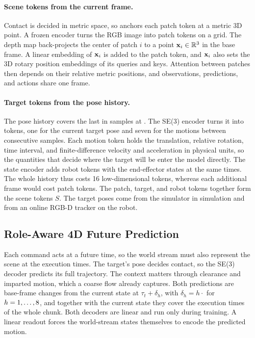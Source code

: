 \paragraph{Scene tokens from the current frame.}
Contact is decided in metric space, so \ours anchors each patch token at a metric 3D
point. A frozen \cfgVisualEncoder{} \cite{mae} encoder turns the RGB image into
\cfgPatches{} patch tokens on a \cfgContextGrid{} grid. The depth map back-projects the
center of patch $i$ to a point $\mathbf{x}_i\in\mathbb{R}^3$ in the base frame. A linear embedding
of $\mathbf{x}_i$ is added to the patch token, and $\mathbf{x}_i$ also sets the 3D rotary
position embeddings of its queries and keys. Attention between patches then depends on
their relative metric positions, and observations, predictions, and actions share one
frame.

\paragraph{Target tokens from the pose history.}
The pose history covers the last \cfgHistorySpan{} in \cfgHistoryLen{} samples at
\cfgControlRate{}. The SE(3) encoder turns it into \cfgHistoryLen{} tokens, one for the
current target pose and seven for the motions between consecutive samples. Each motion
token holds the translation, relative rotation, time interval, and finite-difference
velocity and acceleration in physical units, so the quantities that decide where the
target will be enter the model directly. The state encoder adds \cfgHistoryLen{} robot
tokens with the end-effector states at the same times. The whole history thus
costs 16 low-dimensional tokens, whereas each additional frame would cost
\cfgPatches{} patch tokens. The patch, target, and robot tokens together form the scene
tokens $S$. The target poses come from the simulator in simulation and from an online
RGB-D tracker on the robot.

\subsection{Role-Aware 4D Future Prediction}
\label{sec:predict}

Each command acts at a future time, so the world stream must also represent the scene
at the execution times. The target's pose decides contact, so the SE(3) decoder predicts
its full trajectory. The context matters through clearance and imparted motion, which a
coarse flow already captures. Both predictions are base-frame changes from the current
state at $\tau_t+\delta_h$, with $\delta_h=h\cdot$\cfgHorizonStep{} for
$h=1,\ldots,8$, and together with the current state they cover the execution
times of the whole chunk. Both decoders are linear and run only during training. A
linear readout forces the world-stream states themselves to encode the predicted motion.

